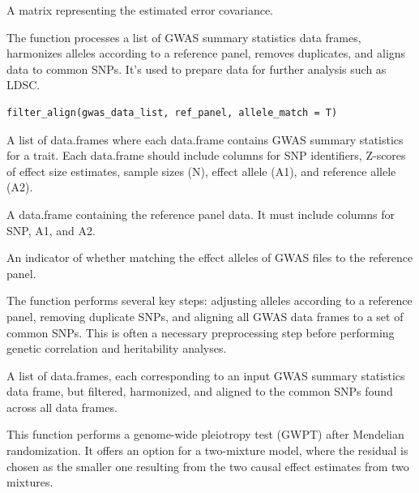\documentclass[a4paper]{book}
\begin{document}
%
\begin{Value}
A matrix representing the estimated error covariance.
\end{Value}
%
\begin{Description}
The  function processes a list of GWAS summary statistics data frames, harmonizes alleles according to a reference panel, removes duplicates, and aligns data to common SNPs. It's used to prepare data for further analysis such as LDSC.
\end{Description}
%
\begin{Usage}
\begin{verbatim}
filter_align(gwas_data_list, ref_panel, allele_match = T)
\end{verbatim}
\end{Usage}
%
\begin{Arguments}
\begin{ldescription}
\item[\code{gwas\_data\_list}] A list of data.frames where each data.frame contains GWAS summary statistics for a trait. Each data.frame should include columns for SNP identifiers, Z-scores of effect size estimates, sample sizes (N), effect allele (A1), and reference allele (A2).

\item[\code{ref\_panel}] A data.frame containing the reference panel data. It must include columns for SNP, A1, and A2.

\item[\code{allele\_match}] An indicator of whether matching the effect alleles of GWAS files to the reference panel.
\end{ldescription}
\end{Arguments}
%
\begin{Details}
The function performs several key steps: adjusting alleles according to a reference panel, removing duplicate SNPs, and aligning all GWAS data frames to a set of common SNPs. This is often a necessary preprocessing step before performing genetic correlation and heritability analyses.
\end{Details}
%
\begin{Value}
A list of data.frames, each corresponding to an input GWAS summary statistics data frame, but filtered, harmonized, and aligned to the common SNPs found across all data frames.
\end{Value}
%
\begin{Description}
This function performs a genome-wide pleiotropy test (GWPT) after Mendelian randomization. It offers an option for a two-mixture model, where the residual is chosen as the smaller one resulting from the two causal effect estimates from two mixtures.
\end{Description}
\end{document}
